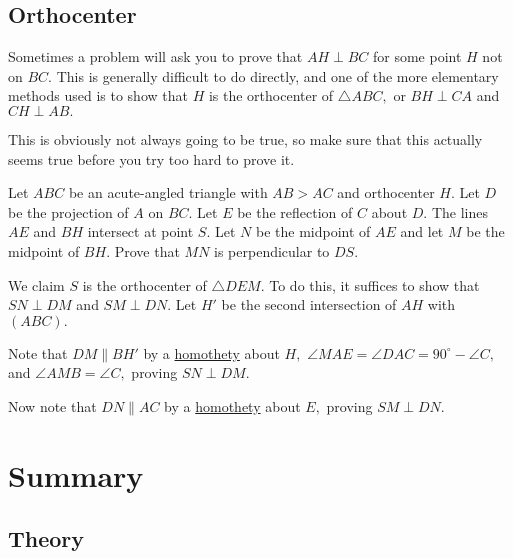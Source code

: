 \subsection{Orthocenter}
Sometimes a problem will ask you to prove that $AH\perp BC$ for some point $H$ not on $BC.$ This is generally difficult to do directly, and one of the more elementary methods used is to show that $H$ is the orthocenter of $\triangle ABC,$ or $BH\perp CA$ and $CH\perp AB.$

This is obviously not always going to be true, so make sure that this actually seems true before you try too hard to prove it.

\begin{exam}
Let $ABC$ be an acute-angled triangle with $AB> AC$ and orthocenter $H$. Let $D$ be the projection of $A$ on $BC$. Let $E$ be the reflection of $C$ about $D$. The lines $AE$ and $BH$ intersect at point $S$. Let $N$ be the midpoint of $AE$ and let $M$ be the midpoint of $BH$. Prove that $MN$ is perpendicular to $DS$.
\end{exam}

\begin{sol}
We claim $S$ is the orthocenter of $\triangle DEM.$ To do this, it suffices to show that $SN\perp DM$ and $SM\perp DN.$ Let $H'$ be the second intersection of $AH$ with $(ABC).$

Note that $DM\parallel BH'$ by a \hyperref[section:homothety]{homothety} about $H,$ $\angle MAE=\angle DAC=90^{\circ}-\angle C,$ and $\angle AMB=\angle C,$ proving $SN\perp DM.$

Now note that $DN\parallel AC$ by a \hyperref[section:homothety]{homothety} about $E,$ proving $SM\perp DN.$
\end{sol}

\section{Summary}

\subsection{Theory}

